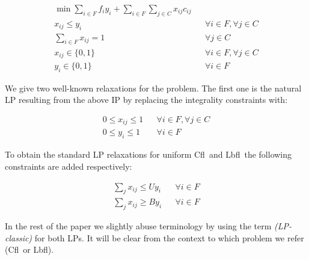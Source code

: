 \documentclass[11pt]{article}\usepackage{amsmath}
\newcommand{\lbfl}{{\sc Lbfl}}
\newcommand{\cfl}{{\sc Cfl}}
\begin{document}
\begin{align}
\min \sum_{i \in F} f_iy_i + \sum_{i \in F}\sum_{j
  \in C} x_{ij}c_{ij}   & &    \label{obj} \\   
x_{ij} \leq y_i   &&  \forall i \in F, \forall j \in C   \label{x<y}  \\
\sum_{i \in F} x_{ij} =1   &&   \forall j \in C   \label{eq}  \\
x_{ij} \in \{0,1\} &&  \forall i \in F, \forall j \in C  \label{eq:intx} \\
y_i \in \{0,1\}   && \forall i \in F   \label{eq:inty}
\end{align}


\iffalse 
\[ \min \{ \sum\limits_{i \in F} f_iy_i + \sum\limits_{i \in F}\sum_{j
  \in C} x_{ij}c_{ij}  \mid    
x_{ij} \leq y_i   \;\;  \forall i \in F, \forall j \in C    
\sum\limits_{i \in F} x_{ij} =1   \;\;  \forall j \in C   
y_i, x_{ij} \in \{0,1\}   \;\; \forall i \in F, \forall j \in C  \} \]
\fi 


We give two well-known relaxations  for the problem.  The first one is the
natural  LP resulting from the above IP by replacing the integrality constraints
 with: 

\begin{align}
0 \leq x_{ij} \leq 1 &&  \forall i \in F, \forall j \in C  \label{1>x>0}  \\
0 \leq y_i \leq 1  && \forall i \in F    \label{eq:nni}
\end{align} 

\iffalse
\[ 
0 \leq y_i \leq 1, \; 0 \leq x_{ij} \leq 1   \;\;\; \forall i \in F, \forall j \in C 
\]
\fi
To obtain the standard LP relaxations for 
uniform \cfl\ and \lbfl\ the following constraints are added
respectively:

\begin{align}
\sum_ {j} x_{ij} \leq U y_i    && \forall i \in F   \label{sat1}\\
\sum_ {j} x_{ij} \geq By_i    && \forall i \in F   \label{sat2}
\end{align} 

\iffalse
\[ \begin{array}{ccc}
\sum_ {j} x_{ij} \leq U y_i  \;\;   \forall i \in F     &  & 
\sum_ {j} x_{ij} \geq By_i   \;\;  \forall i \in F   
\end{array}  \]
\fi

In the rest of the paper we slightly abuse terminology by 
using  the term {\em (LP-classic)} for both LPs. It will be clear from the context to
which problem we refer (\cfl\  or \lbfl). 
\end{document}
